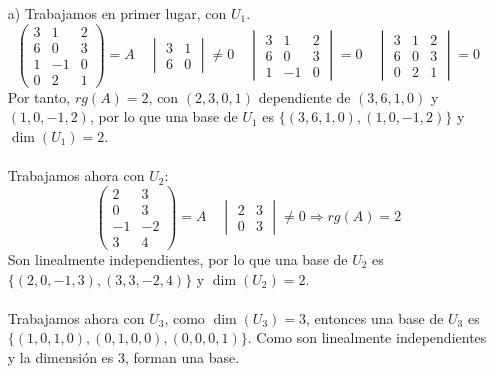 \begin{ejercicio}
	\begin{enumerate}
		\item[a)] Trabajamos en primer lugar, con $U_1$.
			\begin{equation*}
				\begin{pmatrix}
					3 & 1  & 2 \\
					6 & 0  & 3 \\
					1 & -1 & 0 \\
					0 & 2  & 1
				\end{pmatrix} = A \quad \begin{vmatrix}
					3 & 1 \\
					6 & 0
				\end{vmatrix} \neq 0 \quad \begin{vmatrix}
					3 & 1  & 2 \\
					6 & 0  & 3 \\
					1 & -1 & 0
				\end{vmatrix} = 0 \quad \begin{vmatrix}
					3 & 1 & 2 \\
					6 & 0 & 3 \\
					0 & 2 & 1
				\end{vmatrix} = 0
			\end{equation*}
			Por tanto, $rg(A) = 2$, con $(2,3,0,1)$ dependiente de $(3,6,1,0)$ y $(1,0,-1,2)$, por lo que una base de $U_1$ es $\{(3,6,1,0), (1,0,-1,2)\}$ y $\dim(U_1) = 2$.
			\\ \\
			Trabajamos ahora con $U_2$:
			\begin{equation*}
				\begin{pmatrix}
					2  & 3  \\
					0  & 3  \\
					-1 & -2 \\
					3  & 4
				\end{pmatrix} = A \quad \begin{vmatrix}
					2 & 3 \\
					0 & 3
				\end{vmatrix} \neq 0 \Rightarrow rg(A) = 2
			\end{equation*}
			Son linealmente independientes, por lo que una base de $U_2$ es $\{(2,0,-1,3), (3,3,-2,4)\}$ y $\dim(U_2) = 2$.
			\\ \\
			Trabajamos ahora con $U_3$, como $\dim(U_3) = 3$, entonces una base de $U_3$ es $\{(1,0,1,0), (0,1,0,0), (0,0,0,1)\}$.
			Como son linealmente independientes y la dimensión es 3, forman una base.

\end{enumerate}
\end{ejercicio}

